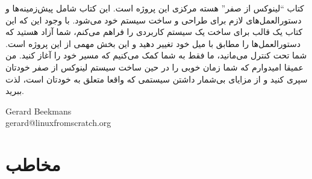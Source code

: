 \documentclass{book}
\begin{document}
\newline
\newline
کتاب “لینوکس از صفر” هسته مرکزی این پروژه است. این کتاب شامل پیش‌زمینه‌ها و دستورالعمل‌های لازم برای طراحی و ساخت سیستم خود می‌شود. با وجود این که این کتاب یک قالب برای ساخت یک سیستم کاربردی را فراهم می‌کنم، شما آزاد هستید که دستورالعمل‌ها را مطابق با میل خود تغییر دهید و این بخش مهمی از این پروژه است. شما تحت کنترل می‌مانید، ما فقط به شما کمک می‌کنیم که مسیر خود را آغاز کنید.
\newline
\newline
من عمیقا امیدوارم که شما زمان خوبی را در حین ساخت سیستم لینوکس از صفر خودتان سپری کنید و از مزایای بی‌شمار داشتن 
سیستمی که واقعا متعلق به خودتان است، لذت ببرید.
\newline
\newline
\begin{flushleft}
Gerard Beekmans \\
gerard@linuxfromscratch.org
\end{flushleft}

\newpage

\section{مخاطب}
\end{document}
